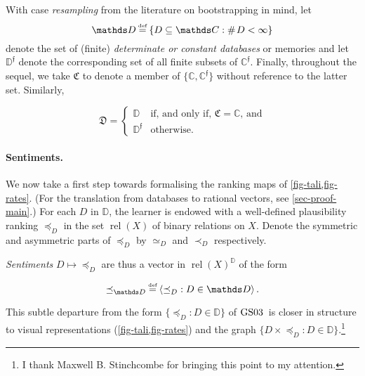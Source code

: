 \documentclass[12pt,a4paper,twoside]{article}
\newcommand{\gsii}{$\textup{GS03}$}
\newcommand{\relations}{\operatorname{rel}}
\newcommand{\novel}{\mathfrak f}
\newcommand{\precb}{\mathbin{\prec}}
\newcommand{\preceqb}{\mathbin{\preceq}}
\newcommand{\countof}{\mathbin{\#}\hskip1pt}
\newcommand{\mbbd}{{\mathds D}}
\newcommand{\mbbdp}{{\mathds D^{\novel}}}
\newcommand{\dpp}{{\mathfrak D}}
\newcommand{\mbbc}{{\mathds C}}
\newcommand{\mbbcp}{{\mathds C^{\novel}}}
\newcommand{\cpp}{{\mathfrak C}}
\newcommand{\lbc}{\left\{}
\newcommand{\rbc}{\right\}}
\begin{document}
With case \emph{resampling} from the literature on bootstrapping in mind, let
\begin{equation*}\mbbd\defeq \lbc D\subseteq \mbbc: \countof D < \infty \rbc \end{equation*} denote the set
of (finite) \emph{determinate or constant databases} or memories and let
$\mbbdp$ denote the corresponding set of all finite subsets of $\mbbcp$.
Finally, throughout the sequel, we take $\cpp$ to denote a member of
$\{\mbbc, \mbbcp\}$ without reference to the latter set. Similarly, 
\begin{linenomath*} \begin{equation*} \text{$\dpp$} =
  \left\{ \begin{array}{ll} \mbbd & \text{if, and only if, $\cpp = \mbbc$,
  and}\\ \mbbdp & \text{otherwise.} \end{array}\right.  \end{equation*}
\end{linenomath*}
\paragraph{Sentiments.}\hskip-5pt We now take a first
step towards formalising the ranking maps of \cref{fig-tali,fig-rates}.
(For the translation from databases to rational vectors, see
\cref{sec-proof-main}.)
For each $D$ in $\mbbd$, the learner is endowed with a well-defined
plausibility ranking $\preceqb_D$ in the set $\relations(X)$ of binary
relations on $X$.  Denote the symmetric and asymmetric parts of $\preceqb_D$ by
$\simeq _D$ and $\precb_D$ respectively. 

\emph{Sentiments} $D \mapsto \preceqb_{D}$ are thus a vector in
$\relations(X)^{\mbbd}$ of the form
\begin{linenomath*}
  \begin{equation*}\preceqb_{\mbbd} \defeq \langle\preceqb_{D} : D\in
  \mbbd\rangle\,.\end{equation*}
\end{linenomath*}
This subtle departure from the form $\{\preceqb_{D} : D \in \mbbd\}$ of \gsii\
is closer in structure to visual representations (\cref{fig-tali,fig-rates})
and the graph $\{D \times \preceqb_{D} : D \in \mbbd\}$.\footnote{I thank
Maxwell B.  Stinchcombe for bringing this point to my attention.}
\end{document}
